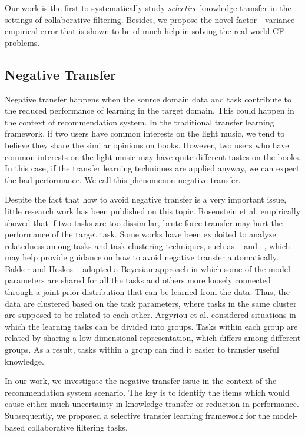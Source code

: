 Our work is the first to systematically study {\em selective} knowledge transfer in the settings of collaborative filtering. Besides, we propose the novel factor - variance empirical error that is shown to be of much help in solving the real world CF problems.

\hspace{0.05in}
\subsection{Negative Transfer}
Negative transfer happens when the source domain data and task contribute to the reduced performance of learning in the target domain.
This could happen in the context of recommendation system. In the traditional transfer learning framework, if two users have common interests on the light music, we tend to believe they share the similar opinions on books. However, two users who have common interests on the light music may have quite different tastes on the books. In this case, if the transfer learning techniques are applied anyway, we can expect the bad performance. We call this phenomenon negative transfer.

Despite the fact that how to avoid negative transfer is a very important issue, little research work has been published on this topic. Rosenstein et al. \cite{rosenstein2005transfer} empirically showed that if two tasks are too dissimilar, brute-force transfer may hurt the performance of the target task. Some works have been exploited to analyze relatedness among tasks and task clustering techniques, such as ~\cite{ben2003exploiting} and ~\cite{bakker2003task}, which may help provide guidance on how to avoid negative transfer automatically. Bakker and Heskes ~\cite{bakker2003task} adopted a Bayesian approach in which some of the model parameters are shared for all the tasks and others more loosely connected through a joint prior distribution that can be learned from the data. Thus, the data are clustered based on the task parameters, where tasks in the same cluster are
supposed to be related to each other. Argyriou et al. \cite{argyriou2008algorithm} considered situations in which the learning tasks can be divided into groups. Tasks within each group are related by sharing a low-dimensional representation, which differs among different groups. As a result, tasks within a group can find it easier to transfer useful knowledge.

In our work, we investigate the negative transfer issue in the context of the recommendation system scenario. The key is to identify the items which would cause either much uncertainty in knowledge transfer or reduction in performance. Subsequently, we proposed a selective transfer learning framework for the model-based collaborative filtering tasks.

